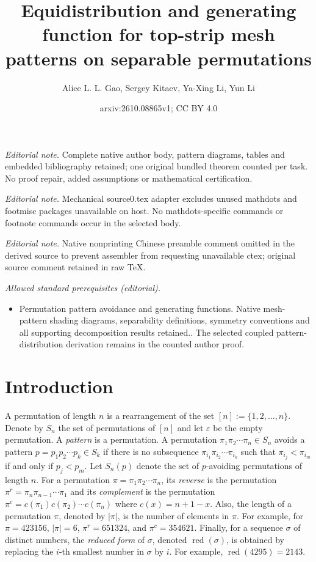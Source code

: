 \documentclass[10pt,a4paper]{article}
\title{Equidistribution and generating function for top-strip mesh patterns on separable permutations}
\author{Alice L. L. Gao, Sergey Kitaev, Ya-Xing Li, Yun Li}
\date{arxiv:2610.08865v1; CC BY 4.0}
\DeclareMathOperator{\red}{red}
\begin{document}
\maketitle
\noindent\textit{Editorial note.} Complete native author body, pattern diagrams, tables and embedded bibliography retained; one original bundled theorem counted per task. No proof repair, added assumptions or mathematical certification.\par\medskip
\noindent\textit{Editorial note.} Mechanical source0.tex adapter excludes unused mathdots and footmisc packages unavailable on host. No mathdots-specific commands or footnote commands occur in the selected body.\par\medskip
\noindent\textit{Editorial note.} Native nonprinting Chinese preamble comment omitted in the derived source to prevent assembler from requesting unavailable ctex; original source comment retained in raw TeX.\par\medskip
\noindent\textit{Allowed standard prerequisites (editorial).}\begin{itemize}
\item Permutation pattern avoidance and generating functions. Native mesh-pattern shading diagrams, separability definitions, symmetry conventions and all supporting decomposition results retained.. The selected coupled pattern-distribution derivation remains in the counted author proof.
\end{itemize}\medskip
\section{Introduction}\label{intro}

A permutation of length $n$ is a rearrangement of the set $[n]:=\{1,2,\ldots,n\}$. Denote by  $S_n$  the set of permutations of $[n]$ and let $\varepsilon$ be the empty permutation. A {\em pattern} is a permutation. A permutation $\pi_1\pi_2\cdots\pi_n\in S_n$ avoids a pattern $p=p_1p_2\cdots p_k\in S_k$  if there is no subsequence $\pi_{i_1}\pi_{i_2}\cdots\pi_{i_k}$ such that $\pi_{i_j}<\pi_{i_m}$ if and only if $p_j<p_m$.  Let $S_n(p)$ denote the set of $p$-avoiding permutations of length $n$. For a permutation $\pi=\pi_1\pi_2\cdots\pi_n$, its {\em reverse} is the permutation $\pi^r=\pi_n\pi_{n-1}\cdots \pi_1$ and its {\em complement} is the permutation $\pi^c=c(\pi_1)c(\pi_2)\cdots c(\pi_n)$ where $c(x)=n+1-x$. Also, the length of a permutation $\pi$, denoted by $|\pi|$, is the number of elements in $\pi$. For example, for $\pi=423156$, $|\pi|=6$, $\pi^r=651324$, and $\pi^c=354621$. Finally, for a sequence $\sigma$ of distinct numbers, the {\em reduced form} of $\sigma$, denoted $\red(\sigma)$, is obtained by replacing the $i$-th smallest number in $\sigma$ by $i$. For example, $\red(4295)=2143$. 
\end{document}
